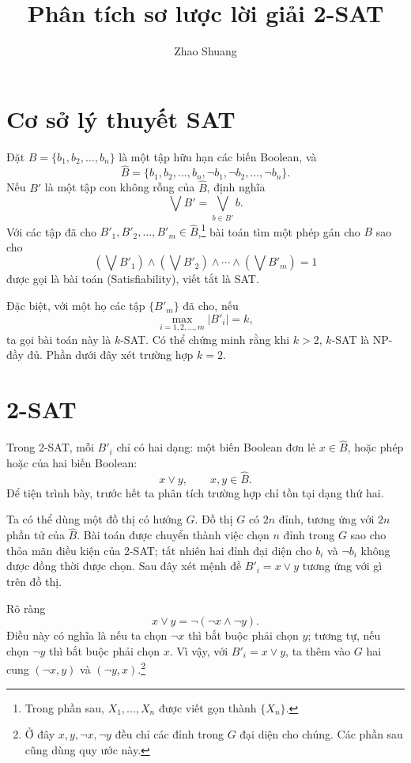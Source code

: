 \documentclass[11pt]{article}
\title{Phân tích sơ lược lời giải 2-SAT}
\author{Zhao Shuang}
\date{}
\begin{document}
\maketitle


\section{Cơ sở lý thuyết SAT}

Đặt $B=\{b_1,b_2,\ldots,b_n\}$ là một tập hữu hạn các biến Boolean, và
\[
  \hat B=\{b_1,b_2,\ldots,b_n,\neg b_1,\neg b_2,\ldots,\neg b_n\}.
\]
Nếu $B'$ là một tập con không rỗng của $\hat B$, định nghĩa
\[
  \bigvee B'=\bigvee_{b\in B'} b.
\]
Với các tập đã cho $B'_1,B'_2,\ldots,B'_m\in \hat B$,\footnote{Trong phần sau,
$X_1,\ldots,X_n$ được viết gọn thành $\{X_n\}$.} bài toán tìm một phép gán cho
$B$ sao cho
\[
  \left(\bigvee B'_1\right)\land
  \left(\bigvee B'_2\right)\land \cdots \land
  \left(\bigvee B'_m\right)=1
\]
được gọi là bài toán  (Satisfiability), viết tắt là SAT.

Đặc biệt, với một họ các tập $\{B'_m\}$ đã cho, nếu
\[
  \max_{i=1,2,\ldots,m} |B'_i|=k,
\]
ta gọi bài toán này là $k$-SAT. Có thể chứng minh rằng khi $k>2$, $k$-SAT là
NP-đầy đủ. Phần dưới đây xét trường hợp $k=2$.

\section{2-SAT}

Trong 2-SAT, mỗi $B'_i$ chỉ có hai dạng: một biến Boolean đơn lẻ
$x\in \hat B$, hoặc phép hoặc của hai biến Boolean:
\[
  x\lor y,\qquad x,y\in \hat B.
\]
Để tiện trình bày, trước hết ta phân tích trường hợp chỉ tồn tại dạng thứ hai.

Ta có thể dùng một đồ thị có hướng $G$. Đồ thị $G$ có $2n$ đỉnh, tương ứng với
$2n$ phần tử của $\hat B$. Bài toán được chuyển thành việc chọn $n$ đỉnh trong
$G$ sao cho thỏa mãn điều kiện của 2-SAT; tất nhiên hai đỉnh đại diện cho
$b_i$ và $\neg b_i$ không được đồng thời được chọn. Sau đây xét mệnh đề
$B'_i=x\lor y$ tương ứng với gì trên đồ thị.

Rõ ràng
\[
  x\lor y=\neg(\neg x\land \neg y).
\]
Điều này có nghĩa là nếu ta chọn $\neg x$ thì bắt buộc phải chọn $y$; tương tự,
nếu chọn $\neg y$ thì bắt buộc phải chọn $x$. Vì vậy, với $B'_i=x\lor y$, ta
thêm vào $G$ hai cung $(\neg x,y)$ và $(\neg y,x)$.\footnote{Ở đây
$x,y,\neg x,\neg y$ đều chỉ các đỉnh trong $G$ đại diện cho chúng. Các phần
sau cũng dùng quy ước này.}
\end{document}
